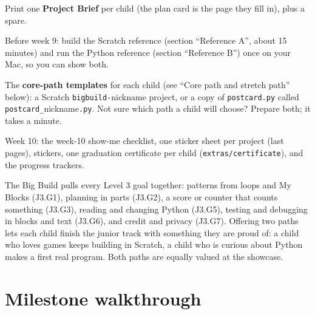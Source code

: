 \documentclass[track=junior,level=3,teacher]{kidscode}
\begin{document}
\begin{materials}
  \item Print one \textbf{Project Brief} per child (the plan card is the page they fill in), plus a spare.
  \item Before week 9: build the Scratch reference (section \enquote{Reference A}, about 15 minutes) and
        run the Python reference (section \enquote{Reference B}) once on your Mac, so you can show both.
  \item The \textbf{core-path templates} for each child (see \enquote{Core path and stretch path} below):
        a Scratch \texttt{bigbuild-}nickname project, or a copy of \texttt{postcard.py} called
        \texttt{postcard\_}nickname\texttt{.py}. Not sure which path a child will choose? Prepare both; it takes a minute.
  \item Week 10: the week-10 show-me checklist, one sticker sheet per project (last pages), stickers,
        one graduation certificate per child (\texttt{extras/\allowbreak{}certificate}), and the progress trackers.
\end{materials}

\begin{teachernote}
The Big Build pulls every Level 3 goal together: patterns from loops and My Blocks (J3.G1), planning
in parts (J3.G2), a score or counter that counts something (J3.G3), reading and changing Python
(J3.G5), testing and debugging in blocks and text (J3.G6), and credit and privacy (J3.G7). Offering two
paths lets each child finish the junior track with something they are proud of: a child who loves
games keeps building in Scratch, a child who is curious about Python makes a first real program.
Both paths are equally valued at the showcase.
\end{teachernote}

\section{Milestone walkthrough}
\end{document}

